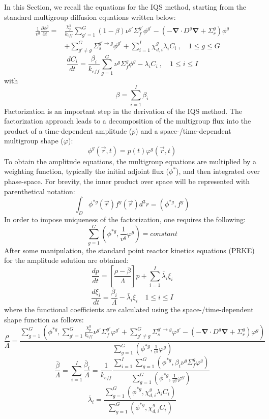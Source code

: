 \documentclass[12pt]{article}
\newcommand{\bs}[1]{\mathbf{#1}}
\renewcommand{\div}{\bs{\nabla}\! \cdot \!}
\newcommand{\grad}{\bs{\nabla}}
\newcommand{\keff}{k_\textit{eff}}
\newcommand{\be}{\begin{equation}}
\newcommand{\ee}{\end{equation}}
\begin{document}
In this Section, we recall the equations for the IQS method, starting from the standard multigroup diffusion equations written below:
\begin{align}
\frac{1}{v^g} \frac{\partial \phi^g }{\partial t} =& \frac{\chi_p^g}{\keff} \sum_{g'=1}^G (1-\beta) \nu^{g'} \Sigma_f^{g'} \phi^{g'} -  \left( -\div D^g \grad  + \Sigma_r^g \right) \phi^g  \nonumber \\
&  + \sum_{g'\neq g}^G\Sigma_s^{g'\to g} \phi^{g'}  + \sum_{i=1}^I\chi_{d,i}^g\lambda_i C_i \ , \quad 1 \le g \le G 
\end{align}
\be
\frac{dC_i}{dt} = \frac{\beta_i}{k_{eff}}\sum_{g=1}^G\nu^{g} \Sigma_f^g \phi^{g} - \lambda_i C_i \ , \quad 1 \le i \le I 
\ee
with
\be
\beta = \sum_{i=1}^I \beta_{i} 
\ee
Factorization is an important step in the derivation of the IQS method. The factorization approach leads to a decomposition of the multigroup flux into the product of a time-dependent amplitude ($p$) and a space-/time-dependent multigroup shape ($\varphi$):
\be
\phi^g(\vec{r},t)=p(t)\varphi^g(\vec{r},t)
\ee
To obtain the amplitude equations, the multigroup equations are multiplied by a weighting function, typically the initial adjoint flux ($\phi^*$), and then integrated over phase-space.  For brevity, the inner product over space will be represented with parenthetical notation:
\be
\int_D\phi^{*g}(\vec{r})f^g(\vec{r})d^3r=\left(\phi^{*g},f^g\right)
\ee
In order to impose uniqueness of the factorization, one requires the following:
\be
\sum_{g=1}^G\left(\phi^{*g},\frac{1}{v^g}\varphi^g\right) = \textit{constant}
\ee
After some manipulation, the standard point reactor kinetics equations (PRKE) for the amplitude solution are obtained:
\be
\frac{dp}{dt}=\left[\frac{\rho-\bar{\beta}}{\Lambda}\right]p+\sum_{i=1}^I\bar{\lambda}_i\xi_i
\ee
\be
\frac{d\xi_i}{dt}=\frac{\bar{\beta}_i}{\Lambda}-\bar{\lambda}_i\xi_i \quad 1 \le i \le I 
\ee
where the functional coefficients are calculated using the space-/time-dependent shape function as follows:
\be
\frac{\rho}{\Lambda}=
\frac{ \sum_{g=1}^G \left(\phi^{*g},\sum_{g'=1}^G\frac{\chi_p^g}{\keff} \nu^{g'} \Sigma_f^{g'}\varphi^{g'} + \sum_{g'\neq g}^G\Sigma_s^{g'\to g} \varphi^{g'} -\left( -\div D^g \grad  + \Sigma_r^g \right)\varphi^g\right)}
{\sum_{g=1}^G \left(\phi^{*g},\frac{1}{v^g}\varphi^g\right)}
\ee
\be
\frac{\bar{\beta}}{\Lambda}=\sum_{i=1}^I\frac{\bar{\beta}_i}{\Lambda}=\frac{1}{\keff}
\frac{\sum_{i=1}^I\sum_{g=1}^G(\phi^{*g}, \beta_i\nu^{g} \Sigma_f^g \varphi^{g})}
{\sum_{g=1}^G \left(\phi^{*g},\frac{1}{v^g}\varphi^g\right)}
\ee
\be
\bar{\lambda}_i=\frac{\sum_{g=1}^G(\phi^{*g},\chi_{d,i}^g\lambda_i C_i)}{\sum_{g=1}^G(\phi^{*g},\chi_{d,i}^gC_i)}
\ee
\end{document}
